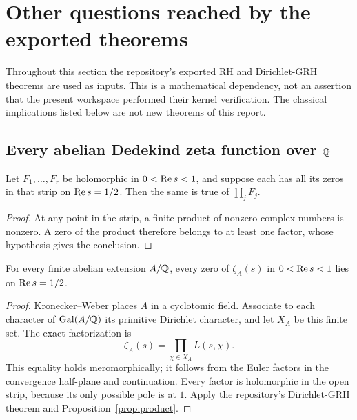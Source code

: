\section{Other questions reached by the exported theorems}\label{sec:consequences}

Throughout this section the repository's exported RH and Dirichlet-GRH theorems are used as inputs. This is a mathematical dependency, not an assertion that the present workspace performed their kernel verification. The classical implications listed below are not new theorems of this report.

\subsection{Every abelian Dedekind zeta function over \texorpdfstring{\(\mathbb{Q}\)}{Q}}

\begin{proposition}\label{prop:product}
Let \(F_1,\ldots,F_r\) be holomorphic in \(0<\operatorname{Re} s<1\), and suppose each has all its zeros in that strip on \(\operatorname{Re} s=1/2\). Then the same is true of \(\prod_jF_j\).
\end{proposition}

\begin{proof}
At any point in the strip, a finite product of nonzero complex numbers is nonzero. A zero of the product therefore belongs to at least one factor, whose hypothesis gives the conclusion.
\end{proof}

\begin{corollary}\label{cor:abelian}
For every finite abelian extension \(A/\mathbb{Q}\), every zero of \(\zeta_A(s)\) in \(0<\operatorname{Re} s<1\) lies on \(\operatorname{Re} s=1/2\).
\end{corollary}

\begin{proof}
Kronecker--Weber places \(A\) in a cyclotomic field. Associate to each character of \(\operatorname{Gal}(A/\mathbb{Q})\) its primitive Dirichlet character, and let \(X_A\) be this finite set. The exact factorization is
\begin{equation}\label{eq:abelian}
\zeta_A(s)=\prod_{\chi\in X_A}L(s,\chi).
\end{equation}
This equality holds meromorphically; it follows from the Euler factors in the convergence half-plane and continuation. Every factor is holomorphic in the open strip, because its only possible pole is at \(1\). Apply the repository's Dirichlet-GRH theorem and Proposition~\ref{prop:product}.
\end{proof}

